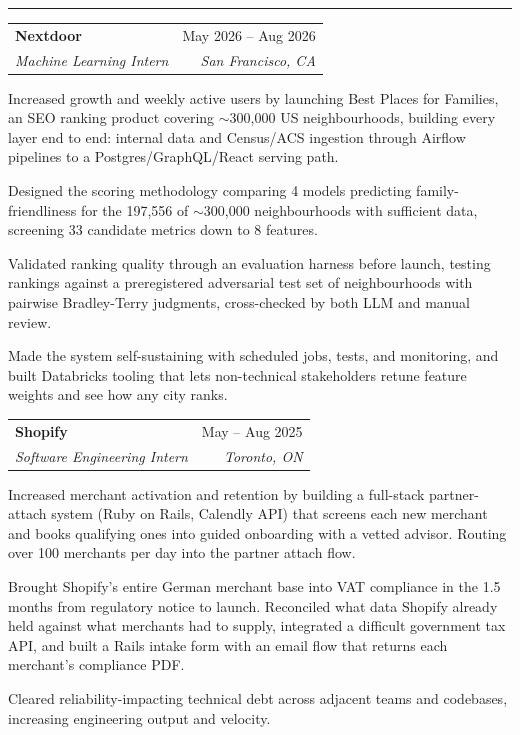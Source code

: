 \documentclass[letterpaper,10pt]{article}
\makeatletter
\newcommand{\Section}[1]{\vspace{4pt}{\large\bfseries #1}\vspace{1pt}\hrule\vspace{3pt}}
\newcommand{\entry}[4]{%
  \vspace{2pt}%
  \begin{tabular*}{\textwidth}{@{}l@{\extracolsep{\fill}}r@{}}
    \textbf{#1} & #2 \\
    \textit{#3} & \textit{#4} \\
  \end{tabular*}\vspace{-4pt}}
\newenvironment{bullets}%
  {\begin{list}{\textbullet}{%
     \setlength{\leftmargin}{1.3em}\setlength{\labelsep}{0.5em}%
     \setlength{\itemsep}{1.5pt}\setlength{\topsep}{2pt}%
     \setlength{\parsep}{0pt}\setlength{\partopsep}{0pt}}}%
  {\end{list}}
\makeatother
\begin{document}
\Section{Experience}
\entry{Nextdoor}{May 2026 -- Aug 2026}{Machine Learning Intern}{San Francisco, CA}
\begin{bullets}
  \item Increased growth and weekly active users by launching Best Places for Families, an SEO ranking product covering $\sim$300,000 US neighbourhoods, building every layer end to end: internal data and Census/ACS ingestion through Airflow pipelines to a Postgres/GraphQL/React serving path.
  \item Designed the scoring methodology comparing 4 models predicting family-friendliness for the 197,556 of $\sim$300,000 neighbourhoods with sufficient data, screening 33 candidate metrics down to 8 features.
  \item Validated ranking quality through an evaluation harness before launch, testing rankings against a preregistered adversarial test set of neighbourhoods with pairwise Bradley-Terry judgments, cross-checked by both LLM and manual review.
  \item Made the system self-sustaining with scheduled jobs, tests, and monitoring, and built Databricks tooling that lets non-technical stakeholders retune feature weights and see how any city ranks.
\end{bullets}
\entry{Shopify}{May -- Aug 2025}{Software Engineering Intern}{Toronto, ON}
\begin{bullets}
  \item Increased merchant activation and retention by building a full-stack partner-attach system (Ruby on Rails, Calendly API) that screens each new merchant and books qualifying ones into guided onboarding with a vetted advisor. Routing over 100 merchants per day into the partner attach flow.
  \item Brought Shopify's entire German merchant base into VAT compliance in the 1.5 months from regulatory notice to launch. Reconciled what data Shopify already held against what merchants had to supply, integrated a difficult government tax API, and built a Rails intake form with an email flow that returns each merchant's compliance PDF.
  \item Cleared reliability-impacting technical debt across adjacent teams and codebases, increasing engineering output and velocity.
\end{bullets}
\end{document}
